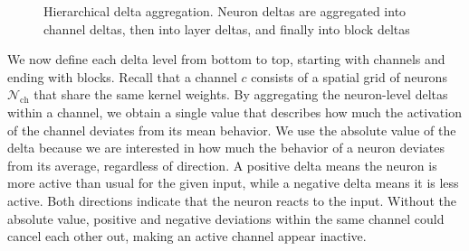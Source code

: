 \documentclass[
12pt,
fancyheadings,
a4paper,
twoside,
BCOR=0.7cm,
nobcorignoretitle,
grayscalebody,
]{stsreprt}
\begin{document}
\begin{figure}[ht!]
    \centering
    \caption{Hierarchical delta aggregation. Neuron deltas are aggregated into channel deltas, then into layer deltas, and finally into block deltas}
    \label{fig:delta_aggregation}
\end{figure}

We now define each delta level from bottom to top, starting with channels and ending with blocks.
Recall that a channel $c$ consists of a spatial grid of neurons $\mathcal{N}_{\text{ch}}$ that
share the same kernel weights.
By aggregating the neuron-level deltas within a channel, we obtain a single value that describes
how much the activation of the channel deviates from its mean behavior.
We use the absolute value of the delta because we are interested in how much the behavior of a
neuron deviates from its average, regardless of direction.
A positive delta means the neuron is more active than usual for the given input, while a negative
delta means it is less active.
Both directions indicate that the neuron reacts to the input.
Without the absolute value, positive and negative deviations within the same channel could cancel
each other out, making an active channel appear inactive.
\end{document}
